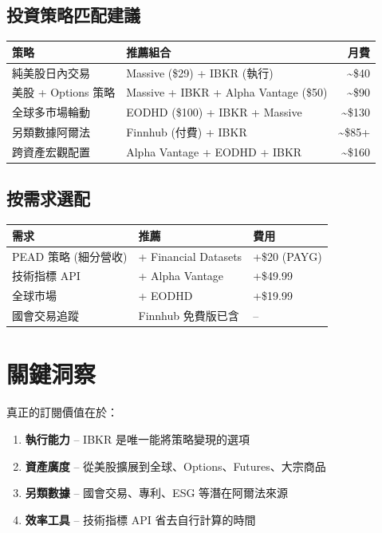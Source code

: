\documentclass[11pt,a4paper]{article}
\begin{document}
\subsection{投資策略匹配建議}

\begin{table}[H]
\centering
\begin{tabular}{@{}llr@{}}
\toprule
\textbf{策略} & \textbf{推薦組合} & \textbf{月費} \\
\midrule
純美股日內交易 & Massive (\$29) + IBKR (執行) & \textasciitilde\$40 \\
美股 + Options 策略 & Massive + IBKR + Alpha Vantage (\$50) & \textasciitilde\$90 \\
全球多市場輪動 & EODHD (\$100) + IBKR + Massive & \textasciitilde\$130 \\
另類數據阿爾法 & Finnhub (付費) + IBKR & \textasciitilde\$85+ \\
跨資產宏觀配置 & Alpha Vantage + EODHD + IBKR & \textasciitilde\$160 \\
\bottomrule
\end{tabular}
\end{table}

\subsection{按需求選配}

\begin{table}[H]
\centering
\begin{tabular}{@{}lll@{}}
\toprule
\textbf{需求} & \textbf{推薦} & \textbf{費用} \\
\midrule
PEAD 策略 (細分營收) & + Financial Datasets & +\$20 (PAYG) \\
技術指標 API & + Alpha Vantage & +\$49.99 \\
全球市場 & + EODHD & +\$19.99 \\
國會交易追蹤 & Finnhub 免費版已含 & -- \\
\bottomrule
\end{tabular}
\end{table}

\newpage
\section{關鍵洞察}

\begin{tcolorbox}[colback=ibkrblue!5,colframe=ibkrblue,title={\textbf{新聞只是冰山一角}}]
真正的訂閱價值在於：
\begin{enumerate}[leftmargin=*]
    \item \textbf{執行能力} -- IBKR 是唯一能將策略變現的選項
    \item \textbf{資產廣度} -- 從美股擴展到全球、Options、Futures、大宗商品
    \item \textbf{另類數據} -- 國會交易、專利、ESG 等潛在阿爾法來源
    \item \textbf{效率工具} -- 技術指標 API 省去自行計算的時間
\end{enumerate}
\end{tcolorbox}
\end{document}
